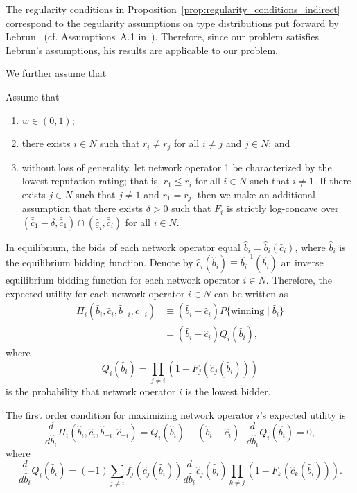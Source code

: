 The regularity conditions in Proposition~\ref{prop:regularity_conditions_indirect} correspond to the regularity assumptions on type distributions put forward by Lebrun~\cite{Lebrun2006} (cf. Assumptions~A.1 in~\cite{Lebrun2006}). Therefore, since our problem satisfies Lebrun's assumptions, his results are applicable to our problem.

We further assume that
\begin{assumptions}
\label{ass:assumptions_generic_indirect}
Assume that
\begin{enumerate}
  \item $w\in(0,1)$;
  \item there exists $i\in N$ such that $r_i\neq r_j$ for all $i\neq j$ and $j\in N$; and
  \item without loss of generality, let network operator 1 be characterized by the lowest reputation rating; that is, $r_1 \leq r_i$ for all $i\in N$ such that $i\neq 1$. If there exists $j\in N$ such that $j\neq 1$ and $r_1 = r_j$, then we make an additional assumption that there exists $\delta > 0$ such that $F_i$ is strictly log-concave over $(\bar{\hat{c}}_1 - \delta, \bar{\hat{c}}_1)\cap (\underline{\hat{c}}_i, \bar{\hat{c}}_i)$ for all $i\in N$.
\end{enumerate}
\end{assumptions}

In equilibrium, the bids of each network operator equal $\hat{b}_i = \hat{b}_i(\hat{c}_i)$, where $\hat{b}_i$ is the equilibrium bidding function. Denote by $\hat{c}_i(\hat{b}_i)\equiv \hat{b}_i^{-1}(\hat{b}_i)$ an inverse equilibrium bidding function for each network operator $i\in N$. Therefore, the expected utility for each network operator $i\in N$ can be written as
\begin{align*}
  \Pi_i(\hat{b}_i,\hat{c}_i,\hat{b}_{-i},\hat{c}_{-i})
  &\equiv (\hat{b}_i - \hat{c}_i)P\{\text{winning}\mid\hat{b}_i\}\\
  &= (\hat{b}_i - \hat{c}_i)Q_i(\hat{b}_i),
\end{align*}
where
\begin{equation*}
Q_i(\hat{b}_i) = \prod_{j\neq i}\left( 1 - F_j(\hat{c}_j(\hat{b}_i)) \right)
\end{equation*}
is the probability that network operator $i$ is the lowest bidder.

The first order condition for maximizing network operator $i$'s expected utility is
\begin{equation}
  \label{eq:foc_indirect}
  \frac{d}{d\hat{b}_i}\Pi_i(\hat{b}_i,\hat{c}_i,\hat{b}_{-i},\hat{c}_{-i}) = Q_i(\hat{b}_i) + (\hat{b}_i - \hat{c}_i)\cdot\frac{d}{d\hat{b}_i}Q_i(\hat{b}_i) = 0,
\end{equation}
where
\begin{equation*}
  \frac{d}{d\hat{b}_i}Q_i(\hat{b}_i) = (-1)\sum_{j\neq i} f_j(\hat{c}_j(\hat{b}_i))\frac{d}{d\hat{b}_i}\hat{c}_j(\hat{b}_i)\prod_{k\neq j} \left( 1 - F_k(\hat{c}_k(\hat{b}_i)) \right).
\end{equation*}


